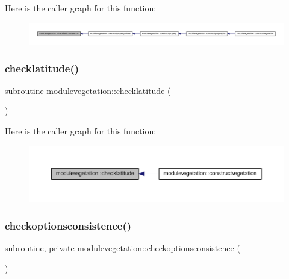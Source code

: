 Here is the caller graph for this function\+:\nopagebreak
\begin{figure}[H]
\begin{center}
\leavevmode
\includegraphics[width=350pt]{namespacemodulevegetation_ac0764a40d57c0889573171b3f85afbf3_icgraph}
\end{center}
\end{figure}
\mbox{\label{namespacemodulevegetation_a8c93a8f99238f47c92bfed9cc9ddedb8}} 
\subsubsection{\texorpdfstring{checklatitude()}{checklatitude()}}
{\footnotesize\ttfamily subroutine modulevegetation\+::checklatitude (\begin{DoxyParamCaption}{ }\end{DoxyParamCaption})\hspace{0.3cm}{\ttfamily [private]}}

Here is the caller graph for this function\+:\nopagebreak
\begin{figure}[H]
\begin{center}
\leavevmode
\includegraphics[width=350pt]{namespacemodulevegetation_a8c93a8f99238f47c92bfed9cc9ddedb8_icgraph}
\end{center}
\end{figure}
\mbox{\label{namespacemodulevegetation_a0b1feb4dec9ae87423940f66f7c66f76}} 
\subsubsection{\texorpdfstring{checkoptionsconsistence()}{checkoptionsconsistence()}}
{\footnotesize\ttfamily subroutine, private modulevegetation\+::checkoptionsconsistence (\begin{DoxyParamCaption}{ }\end{DoxyParamCaption})\hspace{0.3cm}{\ttfamily [private]}}

